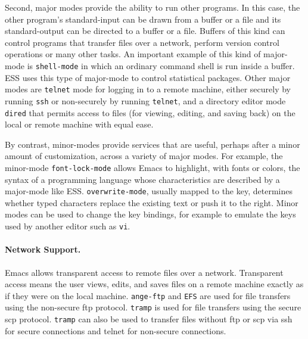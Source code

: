 \documentclass{article}
\newif\ifdraft
\newcommand{\stexttt}[1]{{\small\texttt{#1}}}
\newcommand{\ssf}[1]{{\small\sf{#1}}}
\newcommand{\emptyfig}{
\hspace*{42pt}\rule{324pt}{.25pt}\\
\hspace*{42pt}\rule{.25pt}{10pc}
\rule{316pt}{.25pt}
\rule{.25pt}{10pc}}
\begin{document}
Second, major modes provide the ability to run other programs.  In
this case, the other program's standard-input can be drawn from a
buffer or a file and its standard-output can be directed to a buffer
or a file.  Buffers of this kind can control programs that transfer
files over a network, perform version control operations or many other
tasks.  An important example of this kind of major-mode is
\stexttt{shell-mode} in which an ordinary command shell is run inside
a buffer.  ESS uses this type of major-mode to control statistical
packages.  Other major modes are \stexttt{telnet} mode for logging in
to a remote machine, either securely by running \stexttt{ssh} or
non-securely by running \stexttt{telnet}, and a directory editor mode
\stexttt{dired} that permits access to files (for viewing, editing,
and saving back) on the local or remote machine with equal ease.

By contrast, minor-modes provide services that are useful, perhaps
after a minor amount of customization, across a variety of major
modes.  For example, the minor-mode \stexttt{font-lock-mode} allows
Emacs to highlight, with fonts or colors, the syntax of a programming
language whose characteristics are described by a major-mode like ESS.
\stexttt{overwrite-mode}, usually mapped to the \ssf{Insert} key,
determines whether typed characters replace the existing text or push
it to the right.  Minor modes can be used to change the key bindings,
for example to emulate the keys used by another editor such as
\stexttt{vi}.

\paragraph{Network Support.}
Emacs allows transparent access to remote files over a network.
Transparent access means the user views, edits, and saves files on a
remote machine exactly as if they were on the local machine.
\stexttt{ange-ftp} and \stexttt{EFS} are used for file transfers using
the non-secure ftp protocol.  \stexttt{tramp} is used for file
transfers using the secure scp protocol.  \stexttt{tramp} can also be
used to transfer files without ftp or scp via ssh for secure
connections and telnet for non-secure connections.

\end{document}
